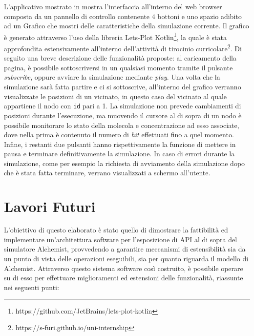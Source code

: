 L'applicativo mostrato in  mostra l'interfaccia all'interno del web browser composta da un pannello di controllo contenente 4 bottoni e uno spazio adibito
ad un Grafico che mostri delle caratteristiche della simulazione corrente. Il grafico è generato attraverso l'uso della libreria Lets-Plot Kotlin\footnote{https://github.com/JetBrains/lets-plot-kotlin},
la quale è stata approfondita estensivamente all'interno dell'attività di tirocinio curricolare\footnote{https://s-furi.github.io/uni-internship}. Di seguito una breve descrizione delle
funzionalità proposte: al caricamento della pagina, è possibile sottoscriversi in un qualsiasi momento tramite il pulsante \textit{subscribe}, oppure avviare la simulazione mediante \textit{play}.
Una volta che la simulazione sarà fatta partire e ci si sottoscrive, all'interno del grafico verranno visualizzate le posizioni di un vicinato, in questo caso del vicinato al quale appartiene il nodo
con \texttt{id} pari a 1. La simulazione non prevede cambiamenti di posizioni durante l'esecuzione, ma muovendo il cursore al di sopra di un nodo è possibile monitorare lo stato
della molecola e concentrazione ad esso associate, dove nella prima è contenuto il numero di \textit{hit} effettuati fino a quel momento. Infine, i restanti due pulsanti hanno rispettivamente
la funzione di mettere in pausa e terminare definitivamente la simulazione. In caso di errori durante la simulazione, come per esempio la richiesta di avviamento della simulazione
dopo che è stata fatta terminare, verrano visualizzati a schermo all'utente.

\section{Lavori Futuri}\label{sec:future-works}
L'obiettivo di questo elaborato è stato quello di dimostrare la fattibilità ed implementare un'architettura software per l'esposizione di \ac{API} al di sopra del simulatore Alchemist,
provvedendo a garantire meccanismi di estensibilità sia da un punto di vista delle operazioni eseguibili, sia per quanto riguarda il modello di Alchemist.
Attraverso questo sistema software così costruito, è possibile operare su di esso per effettuare miglioramenti ed estensioni delle funzionalità, riassunte nei seguenti punti:

